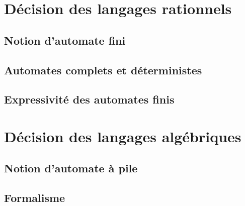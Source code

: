 \documentclass[9pt, handout]{beamer}
\begin{document}
\section{Décision des langages rationnels}
 
\subsection{Notion d'automate fini}






 
\subsection{Automates complets et déterministes}




 
\subsection{Expressivité des automates finis}


 
\section{Décision des langages algébriques}
 
\subsection{Notion d'automate à pile}



 
\subsection{Formalisme}






 
\end{document}

